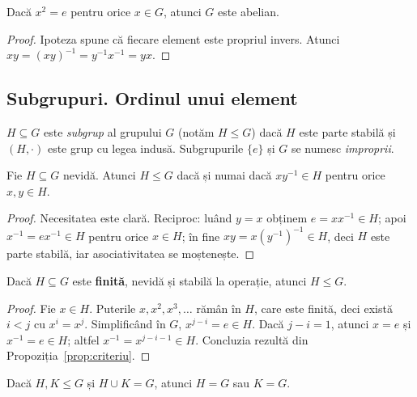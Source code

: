\begin{propozitie}\label{prop:x2e}
Dacă $x^2=e$ pentru orice $x\in G$, atunci $G$ este abelian.
\end{propozitie}

\begin{proof}
Ipoteza spune că fiecare element este propriul invers. Atunci $xy=(xy)^{-1}=y^{-1}x^{-1}=yx$.
\end{proof}

\subsection{Subgrupuri. Ordinul unui element}

\begin{definitie}
$H\subseteq G$ este \emph{subgrup} al grupului $G$ (notăm $H\le G$) dacă $H$ este parte stabilă și $(H,\cdot)$ este grup cu legea indusă. Subgrupurile $\{e\}$ și $G$ se numesc \emph{improprii}.
\end{definitie}

\begin{propozitie}\label{prop:criteriu}
Fie $H\subseteq G$ nevidă. Atunci $H\le G$ dacă și numai dacă $xy^{-1}\in H$ pentru orice $x,y\in H$.
\end{propozitie}

\begin{proof}
Necesitatea este clară. Reciproc: luând $y=x$ obținem $e=xx^{-1}\in H$; apoi $x^{-1}=ex^{-1}\in H$ pentru orice $x\in H$; în fine $xy=x(y^{-1})^{-1}\in H$, deci $H$ este parte stabilă, iar asociativitatea se moștenește.
\end{proof}

\begin{propozitie}\label{prop:finitstabil}
Dacă $H\subseteq G$ este \textbf{finită}, nevidă și stabilă la operație, atunci $H\le G$.
\end{propozitie}

\begin{proof}
Fie $x\in H$. Puterile $x,x^2,x^3,\dots$ rămân în $H$, care este finită, deci există $i<j$ cu $x^i=x^j$. Simplificând în $G$, $x^{j-i}=e\in H$. Dacă $j-i=1$, atunci $x=e$ și $x^{-1}=e\in H$; altfel $x^{-1}=x^{j-i-1}\in H$. Concluzia rezultă din Propoziția~\ref{prop:criteriu}.
\end{proof}

\begin{lema}\label{lema:reuniune}
Dacă $H,K\le G$ și $H\cup K=G$, atunci $H=G$ sau $K=G$.
\end{lema}


